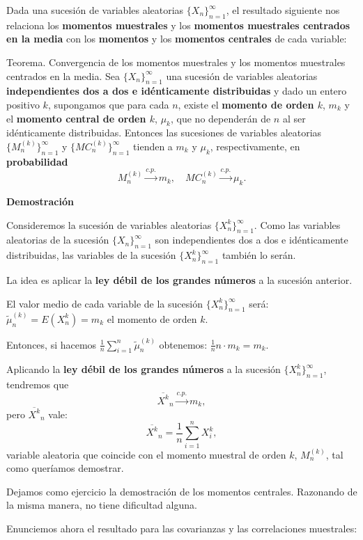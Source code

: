 \documentclass[]{book}
\begin{document}
Dada una sucesión de variables aleatorias \(\{X_n\}_{n=1}^\infty\), el resultado siguiente nos relaciona los \textbf{momentos muestrales} y los \textbf{momentos muestrales centrados en la media} con los \textbf{momentos} y los \textbf{momentos centrales} de cada variable:

 Teorema. Convergencia de los momentos muestrales y los momentos muestrales centrados en la media.
Sea \(\{X_n\}_{n=1}^\infty\) una sucesión de variables aleatorias \textbf{independientes dos a dos e idénticamente distribuidas} y dado un entero positivo \(k\), supongamos que para cada \(n\), existe el \textbf{momento de orden \(k\)}, \(m_k\) y el \textbf{momento central de orden \(k\)}, \(\mu_k\), que no dependerán de \(n\) al ser idénticamente distribuidas. Entonces las sucesiones de variables aleatorias \(\{M_n^{(k)}\}_{n=1}^\infty\) y \(\{MC_n^{(k)}\}_{n=1}^\infty\) tienden a \(m_k\) y \(\mu_k\), respectivamente, en \textbf{probabilidad}
\[
M_n^{(k)}\stackrel{c.p.}{\longrightarrow} m_k,\quad MC_n^{(k)}\stackrel{c.p.}{\longrightarrow} \mu_k.
\]

\textbf{Demostración}

Consideremos la sucesión de variables aleatorias \(\{X_n^k\}_{n=1}^\infty\). Como las variables aleatorias de la sucesión \(\{X_n\}_{n=1}^\infty\) son independientes dos a dos e idénticamente distribuidas, las variables de la sucesión \(\{X_n^k\}_{n=1}^\infty\) también lo serán.

La idea es aplicar la \textbf{ley débil de los grandes números} a la sucesión anterior.

El valor medio de cada variable de la sucesión \(\{X_n^k\}_{n=1}^\infty\) será: \(\tilde{\mu}_n^{(k)}= E(X_n^{k})=m_k\) el momento de orden \(k\).

Entonces, si hacemos \(\frac{1}{n}\sum\limits_{i=1}^n \tilde{\mu}_n^{(k)}\) obtenemos:
\(\frac{1}{n} n\cdot m_k=m_k.\)

Aplicando la \textbf{ley débil de los grandes números} a la sucesión \(\{X_n^k\}_{n=1}^\infty\), tendremos que
\[
\overline{X^k}_n \stackrel{c.p.}{\longrightarrow}m_k,
\]
pero \(\overline{X^k}_n\) vale:
\[
\overline{X^k}_n=\frac{1}{n}\sum_{i=1}^n X_i^k,
\]
variable aleatoria que coincide con el momento muestral de orden \(k\), \(M_n^{(k)}\), tal como queríamos demostrar.

Dejamos como ejercicio la demostración de los momentos centrales. Razonando de la misma manera, no tiene dificultad alguna.

Enunciemos ahora el resultado para las covarianzas y las correlaciones muestrales:
\end{document}
